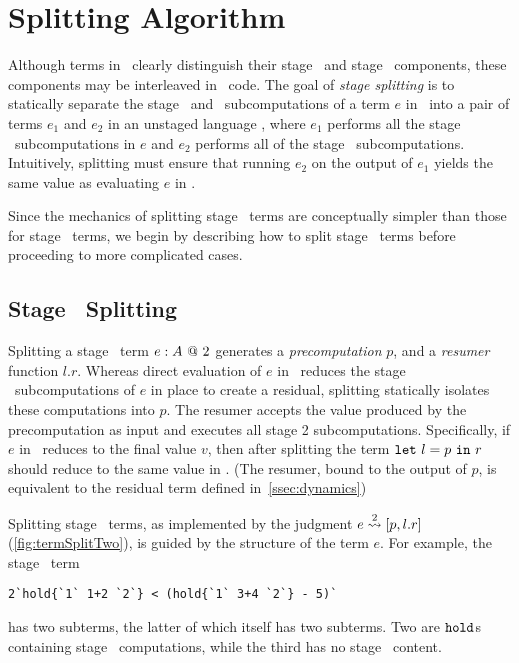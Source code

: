 \section{Splitting Algorithm}
\label{sec:splitting}

Although terms in \lang\ clearly distinguish their stage \bbone\ and stage
\bbtwo\ components, these components may be interleaved in \lang\ code. The
goal of \emph{stage splitting} is to statically separate the stage \bbone\ and \bbtwo\ subcomputations
of a term $e$ in \lang\ into a pair of
terms $e_1$ and $e_2$ in an unstaged language \langmono, where $e_1$ performs all the
stage \bbone\ subcomputations in $e$ and $e_2$ performs all of the stage \bbtwo\ subcomputations.
Intuitively, splitting must ensure that running $e_2$ on the output of $e_1$ yields the same value 
as evaluating $e$ in \lang.

Since the mechanics of splitting stage \bbtwo\ terms are conceptually simpler than those for stage \bbone\
terms, we begin by describing how to split stage \bbtwo\ terms before proceeding to more complicated cases.

\subsection {Stage \bbtwo\ Splitting}

Splitting a stage \bbtwo\ term ${e}:{A}~@~ 2$ generates
 a \emph{precomputation} $p$, and a \emph{resumer} function $l.r$. Whereas direct evaluation of $e$ in \lang\ reduces the stage \bbone\ subcomputations
of $e$ in place to create a residual, splitting statically isolates these computations into
$p$.  The resumer accepts the value produced by the precomputation as input
and executes all stage 2 subcomputations.   
Specifically, if $e$ in \lang\ reduces to the final value $v$, 
then after splitting the term ${\tt let}~{l} = {p}~{\tt in}~{r}$ should reduce to the same value in \langmono.
(The resumer, bound to the output of $p$, is equivalent to the residual term defined in~\ref{ssec:dynamics})






Splitting stage \bbtwo\ terms, as implemented by the judgment $e \overset{ 2}\rightsquigarrow
[p,l.r]$ (\cref{fig:termSplitTwo}), is guided by the structure of the term $e$.
For example, the stage \bbtwo\ term
\begin{lstlisting}
2`hold{`1` 1+2 `2`} < (hold{`1` 3+4 `2`} - 5)`
\end{lstlisting}
has two subterms, the latter of which itself has two subterms. Two are ${\tt hold}$s
containing stage \bbone\ computations, while the third has no stage \bbone\
content. 

